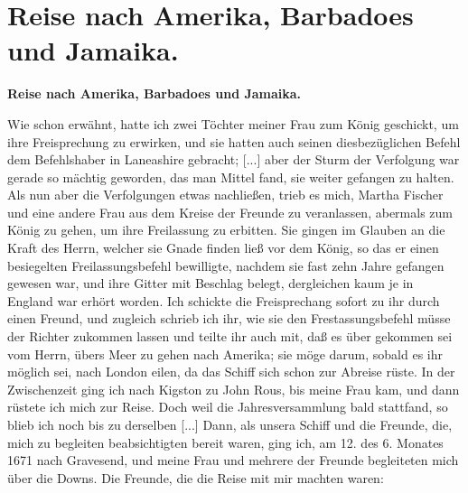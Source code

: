 


\chapter[Reise nach Amerika, Barbadoes und Jamaika.]{Reise nach Amerika, Barbadoes und Jamaika.}

\begin{center}
\textbf{Reise nach Amerika, Barbadoes und Jamaika.}
\end{center}


Wie schon erwähnt, hatte ich zwei Töchter meiner Frau
zum König geschickt, um ihre Freisprechung zu erwirken, und sie
hatten auch seinen diesbezüglichen Befehl dem Befehlshaber in
Laneashire gebracht; [...] aber der Sturm der Verfolgung war
gerade so mächtig geworden, das man Mittel fand, sie weiter
gefangen zu halten. Als nun aber die Verfolgungen etwas
nachließen, trieb es mich, Martha 
Fischer und eine andere Frau
aus dem Kreise der Freunde zu veranlassen, abermals zum König
zu gehen, um ihre Freilassung zu erbitten. Sie gingen im Glauben
an die Kraft des Herrn, welcher sie Gnade finden ließ vor dem
König, so das er einen besiegelten Freilassungsbefehl bewilligte,
nachdem sie fast zehn Jahre gefangen gewesen war, und ihre Gitter
mit Beschlag belegt, dergleichen kaum je in England war erhört
worden. Ich schickte die Freisprechang sofort zu ihr durch einen
Freund, und zugleich schrieb ich ihr, wie sie den Frestassungsbefehl
müsse der Richter zukommen lassen und teilte ihr auch
mit, daß es über gekommen sei vom Herrn, übers Meer zu
gehen nach Amerika; sie möge darum, sobald es ihr möglich sei,
nach London eilen, da das Schiff sich schon zur Abreise rüste.
In der Zwischenzeit ging ich nach Kigston zu John Rous, bis
meine Frau kam, und dann rüstete ich mich zur Reise. Doch
weil die Jahresversammlung bald stattfand, so blieb ich noch bis
zu derselben [...] Dann, als unsera Schiff und die Freunde, die,
mich zu begleiten beabsichtigten bereit waren, ging ich, am 12. des
6. Monates 1671 nach Gravesend, und meine Frau und mehrere der
Freunde begleiteten mich über die Downs. Die Freunde,
die die Reise mit mir machten waren: 
